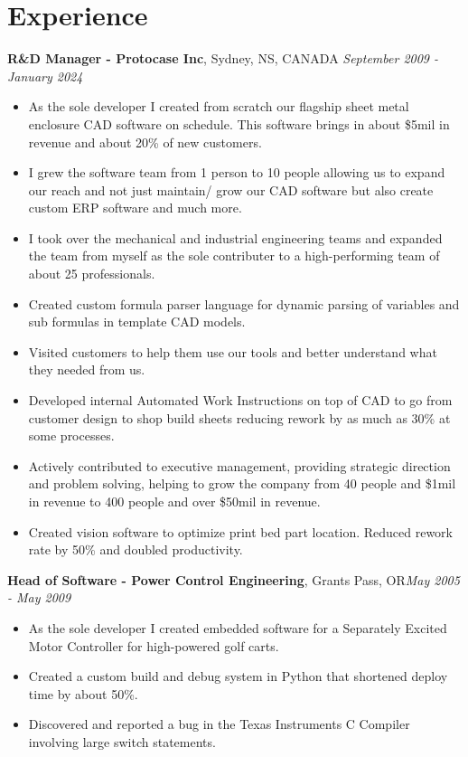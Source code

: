 \documentclass[letter,11pt]{article}
\begin{document}
\section*{Experience}
\noindent
\textbf{R\&D Manager - Protocase Inc}, Sydney, NS, CANADA \hfill \textit{September 2009 - January 2024}
\begin{itemize}[leftmargin=*,itemsep=0pt, parsep=0pt,label=$\diamond$]
\item As the sole developer I created from scratch our flagship sheet metal enclosure CAD software on schedule. This software brings in about \$5mil in revenue and about 20\% of new customers.
\item I grew the software team from 1 person to 10 people allowing us to expand our reach and not just maintain/ grow our CAD software but also create custom ERP software and much more.
\item I took over the mechanical and industrial engineering teams and expanded the team from myself as the sole contributer to a high-performing team of about 25 professionals.
\item Created custom formula parser language for dynamic parsing of variables and sub formulas in template CAD models. 
\item Visited customers to help them use our tools and better understand what they needed from us.
\item Developed internal Automated Work Instructions on top of CAD to go from customer design to shop build sheets reducing rework by as much as 30\% at some processes.
\item Actively contributed to executive management, providing strategic direction and problem solving, helping to grow the company from 40 people and \$1mil in revenue to 400 people and over \$50mil in revenue.
\item Created vision software to optimize print bed part location. Reduced rework rate by 50\% and doubled productivity.
\end{itemize}

\noindent
\textbf{Head of Software - Power Control Engineering}, Grants Pass, OR\hfill \textit{May 2005 - May 2009}
\begin{itemize}[leftmargin=*,itemsep=0pt, parsep=0pt,label=$\diamond$]
\item As the sole developer I created embedded software for a Separately Excited Motor Controller for high-powered golf carts.
\item Created a custom build and debug system in Python that shortened deploy time by about 50\%.
\item Discovered and reported a bug in the Texas Instruments C Compiler involving large switch statements.
\end{itemize}
\end{document}
